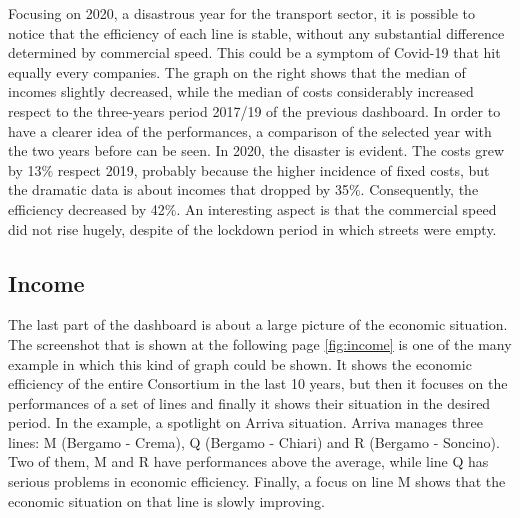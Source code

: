 Focusing on 2020, a disastrous year for the transport sector, it is possible to notice that the efficiency of each line is stable, without any substantial difference determined by commercial speed. This could be a symptom of Covid-19 that hit equally every companies. The graph on the right shows that the median of incomes slightly decreased, while the median of costs considerably increased respect to the three-years period 2017/19 of the previous dashboard. In order to have a clearer idea of the performances, a comparison of the selected year with the two years before can be seen. In 2020, the disaster is evident. The costs grew by 13$\%$ respect 2019, probably because the higher incidence of fixed costs, but the dramatic data is about incomes that dropped by 35$\%$. Consequently, the efficiency decreased by 42$\%$. An interesting aspect is that the commercial speed did not rise hugely, despite of the lockdown period in which streets were empty. 

\newpage
\begin{landscape}
\thispagestyle{empty}

\end{landscape}
\newpage


\newpage
\begin{landscape}
\thispagestyle{empty}

\end{landscape}
\newpage
\begin{landscape}
\thispagestyle{empty}

\end{landscape}

\subsection{Income}
The last part of the dashboard is about a large picture of the economic situation. The screenshot that is shown at the following page \ref{fig:income} is one of the many example in which this kind of graph could be shown. It shows the economic efficiency of the entire Consortium in the last 10 years, but then it focuses on the performances of a set of lines and finally it shows their situation in the desired period. In the example, a spotlight on Arriva situation. Arriva manages three lines: M (Bergamo - Crema), Q (Bergamo - Chiari) and R (Bergamo - Soncino). Two of them, M and R have performances above the average, while line Q has serious problems in economic efficiency. Finally, a focus on line M shows that the economic situation on that line is slowly improving. 

